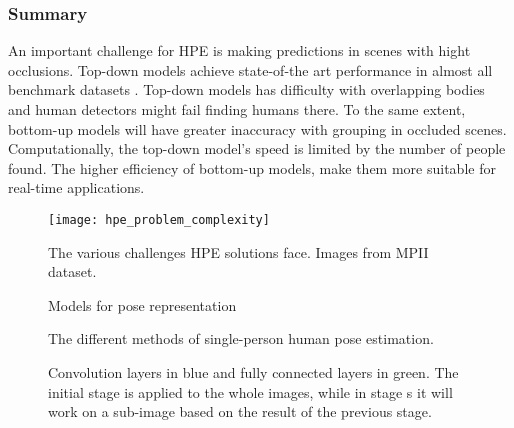 \subsubsection{Summary}
An important challenge for \gls{HPE} is making predictions in scenes with hight occlusions.
Top-down models achieve state-of-the art performance in almost all benchmark datasets \cite{Chen2000}.
Top-down models has difficulty with overlapping bodies and human detectors might fail finding humans there.
To the same extent, bottom-up models will have greater inaccuracy with grouping in occluded scenes.
Computationally, the top-down model's speed is limited by the number of people found.
The higher efficiency of bottom-up models, make them more suitable for real-time applications.

\begin{figure}
	\centering
	\texttt{[image: hpe\_problem\_complexity]}
	\caption{The various challenges HPE solutions face. Images from \gls{MPII} dataset. \cite{Andriluka2014}\cite{Chen2000}}
	\label{fig:hpe_problem_complexity}
\end{figure}

\begin{figure}
	\centering
	\caption{Models for pose representation \cite{Zheng2012}}
	\label{fig:pose_representation}
\end{figure}

\begin{figure}
	\centering
	\caption{The different methods of single-person human pose estimation.\cite{Zheng2012}}
	\label{fig:single_pose_estimation}
\end{figure}

\begin{figure}
	\centering
	\caption{
		Convolution layers in blue and fully connected layers in green.
		The initial stage is applied to the whole images, while in stage s it will work on a sub-image based on the result of the previous stage.\cite{Toshev2014}
	}
	\label{fig:deep_pose}
\end{figure}

